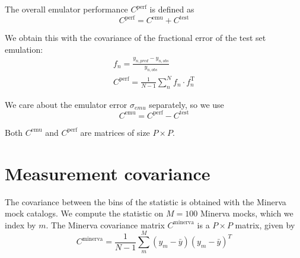 \documentclass[12pt]{article}
\newcommand{\T}{^{\mathrm{T}}}
\newcommand{\cov}[1]{C^\text{#1}}
\begin{document}
The overall emulator performance $\cov{perf}$ is defined as
\begin{equation}
    \cov{perf} = \cov{emu} + \cov{test}
\end{equation}

We obtain this with the covariance of the fractional error of the test set emulation:
\begin{eqnarray}
    f_n = \frac{ y_{n,pred} - y_{n,obs} } {y_{n,obs}} \\
    \cov{perf} = \frac{1}{N-1} \sum_n^N f_n \cdot f_n\T
\end{eqnarray}

We care about the emulator error $\sigma_{emu}$ separately, so we use
\begin{equation}
    \cov{emu} = \cov{perf} - \cov{test}
\end{equation}

Both $\cov{emu}$ and $\cov{perf}$ are matrices of size $P \times P$.

\section{Measurement covariance}

The covariance between the bins of the statistic is obtained with the Minerva mock catalogs. 
We compute the statistic on $M=100$ Minerva mocks, which we index by $m$. 
The Minerva covariance matrix $\cov{minerva}$ is a $P \times P$ matrix, given by
\begin{equation}
\cov{minerva} = \frac{1}{N-1} \sum_m^M (y_{m} - \bar{y})(y_{m} - \bar{y})^T
\end{equation}

\end{document}
